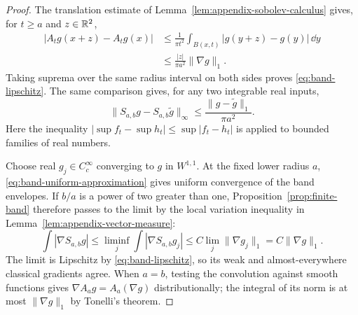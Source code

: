 \begin{proof}
The translation estimate of Lemma~\ref{lem:appendix-sobolev-calculus}
gives, for $t\ge a$ and $z\in\mathbb R^2$,
\begin{align*}
 |A_tg(x+z)-A_tg(x)|
 &\le\frac1{\pi t^2}\int_{B(x,t)}|g(y+z)-g(y)|\,\dd y\\
 &\le\frac{|z|}{\pi a^2}\|\nabla g\|_1.
\end{align*}
Taking suprema over the same radius interval on both sides proves
\eqref{eq:band-lipschitz}. The same comparison gives, for any
two integrable real inputs,
\begin{equation}\label{eq:band-uniform-approximation}
 \|S_{a,b}g-S_{a,b}\widetilde g\|_\infty
       \le\frac{\|g-\widetilde g\|_1}{\pi a^2}.
\end{equation}
Here the inequality $|\sup f_t-\sup h_t|\le\sup|f_t-h_t|$
is applied to bounded families of real numbers.

Choose real $g_j\in C_c^\infty$ converging to $g$ in $W^{1,1}$.
At the fixed lower radius $a$, \eqref{eq:band-uniform-approximation}
gives uniform convergence of the band envelopes. If $b/a$ is a
power of two greater than one, Proposition~\ref{prop:finite-band}
therefore passes to the limit by the local variation inequality
in Lemma~\ref{lem:appendix-vector-measure}:
\[
 \int|\nabla S_{a,b}g|
 \le\liminf_j\int|\nabla S_{a,b}g_j|
 \le C\lim_j\|\nabla g_j\|_1=C\|\nabla g\|_1.
\]
The limit is Lipschitz by \eqref{eq:band-lipschitz}, so its weak
and almost-everywhere classical gradients agree. When $a=b$,
testing the convolution against smooth functions gives
$\nabla A_ag=A_a(\nabla g)$ distributionally; the integral of
its norm is at most $\|\nabla g\|_1$ by Tonelli's theorem.
\end{proof}

